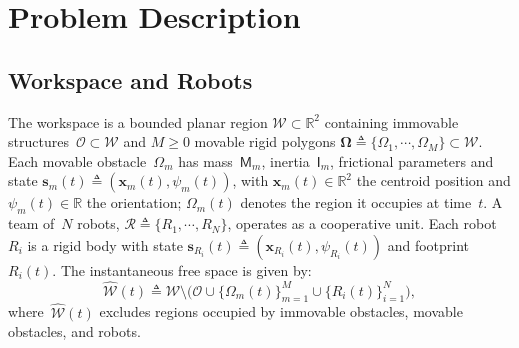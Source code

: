 \section{Problem Description}\label{sec:problem}
\subsection{Workspace and Robots}\label{subsec:ws}
The workspace is a bounded planar region $\mathcal{W}\subset\mathbb{R}^2$
containing immovable structures~$\mathcal{O}\subset\mathcal{W}$ and $M\geq0$
movable rigid polygons
$\boldsymbol{\Omega}\triangleq\{\Omega_1,\cdots,\Omega_M\}\subset\mathcal{W}$.
Each movable obstacle~$\Omega_m$ has mass~$\mathsf{M}_m$,
inertia~$\mathsf{I}_m$, frictional parameters and state
$\mathbf{s}_m(t)\triangleq(\mathbf{x}_m(t),\psi_m(t))$, with
$\mathbf{x}_m(t)\in\mathbb{R}^2$ the centroid position and
$\psi_m(t)\in\mathbb{R}$ the orientation; $\Omega_m(t)$ denotes the region it
occupies at time~$t$. A team of~$N$ robots,
$\mathcal{R}\triangleq\{R_1,\cdots,R_N\}$, operates as a cooperative unit. Each
robot~$R_i$ is a rigid body with state
$\mathbf{s}_{R_i}(t)\triangleq(\mathbf{x}_{R_i}(t),\psi_{R_i}(t))$ and
footprint~$R_i(t)$. The instantaneous free space is given by:
\begin{equation}\label{eq:freespace}
\widehat{\mathcal{W}}(t)\triangleq\mathcal{W}\setminus\Big(
\mathcal{O}\cup\{\Omega_m(t)\}_{m=1}^{M}\cup\{R_i(t)\}_{i=1}^{N}
\Big),
\end{equation}
where~$\widehat{\mathcal{W}}(t)$ excludes regions occupied by immovable
obstacles, movable obstacles, and robots.

